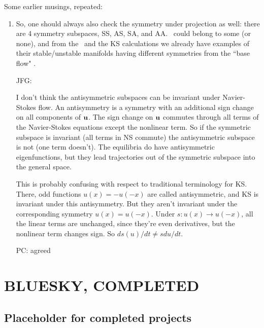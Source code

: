 Some earlier musings, repeated:
\begin{enumerate}
  \item
So, one should always also check the symmetry under
projection as well: there are 4 symmetry subspaces,
SS, AS, SA, and AA.
\Eqva\ could belong to some (or none), and from the \ubranch\ and the KS
calculations
we already have examples of their stable/unstable manifolds
having different symmetries from the ``base flow" \eqv.

JFG:{
I don't think the antisymmetric subspaces can be invariant under
Navier-Stokes flow. An antisymmetry is a symmetry with an additional
sign change on all components of ${\bf u}$. The sign change on ${\bf u}$ commutes
through all terms of the Navier-Stokes equations except the nonlinear term.
So if the symmetric subspace is invariant (all terms in NS commute) the
antisymmetric subspace is not (one term doesn't). The equilibria do have
antisymmetric eigenfunctions, but they lead trajectories out of the
symmetric subspace into the general space.

  This is probably confusing with respect to traditional terminology for
KS. There, odd functions $u(x) = -u(-x)$ are called antisymmetric, and KS is
invariant under this antisymmetry. But they aren't invariant under the
corresponding symmetry $u(x) = u(-x)$. Under
$s : u(x) \to u(-x)$, all the linear terms are unchanged, since they're even
derivatives, but the nonlinear term changes sign. So $d s(u)/dt \neq s du/dt$.


PC: agreed
}
\end{enumerate}


\section{BLUESKY, COMPLETED}

\subsection{Placeholder for completed projects}

